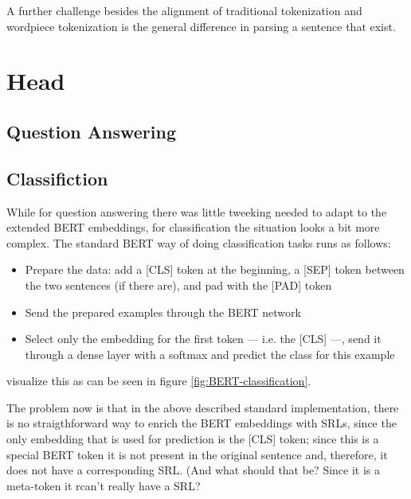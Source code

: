 A further challenge besides the alignment of traditional tokenization and wordpiece tokenization is the general difference in parsing a sentence that exist.

\section{Head}

\subsection{Question Answering}

\subsection{Classifiction}

While for question answering there was little tweeking needed to adapt to the extended BERT embeddings, for classification the situation looks a bit more complex.
The standard BERT way of doing classification tasks runs as follows:

\begin{itemize}
  \item Prepare the data: add a [CLS] token at the beginning, a [SEP] token between the two sentences (if there are), and pad with the [PAD] token
  \item Send the prepared examples through the BERT network
  \item Select only the embedding for the first token  --- i.e. the [CLS] ---, send it through a dense layer with a softmax and predict the class for this example
\end{itemize}

\cite{devlin2018bert} visualize this as can be seen in figure \ref{fig:BERT-classification}.



The problem now is that in the above described standard implementation, there is no straigthforward way to enrich the BERT embeddings with SRLs, since the only embedding that is used for prediction is the [CLS] token;
since this is a special BERT token it is not present in the original sentence and, therefore, it does not have a corresponding SRL.
(And what should that be? Since it is a meta-token it rcan't really have a SRL?

